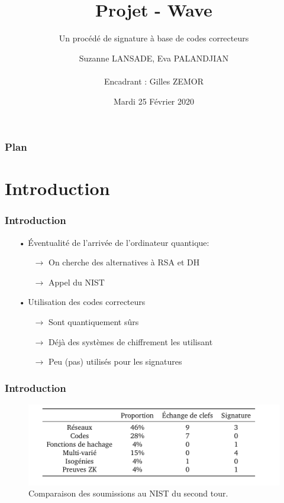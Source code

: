 \documentclass[10pt,a4paper]{beamer}
\title{Projet - Wave}
\subtitle{Un procédé de signature à base de codes correcteurs}
\author{ Suzanne LANSADE, Eva PALANDJIAN \\\quad\quad\quad\quad\quad \\Encadrant : Gilles ZEMOR}
\institute[Master CSI]{Master CSI, Université de Bordeaux, France}
\date{Mardi 25 Février 2020}
\theoremstyle{plain}
\theoremstyle{definition}
\begin{document}
\begin{frame}
  \vspace{3.5em}
  \titlepage

\end{frame}

\begin{frame}
  \frametitle{Plan}
  \tableofcontents[subsectionstyle=hide]
\end{frame}

\section{Introduction}
\begin{frame}
\frametitle{Introduction}
\begin{itemize}
\item[•] Éventualité de l'arrivée de l'ordinateur quantique:
       \begin{itemize}
       \item[$\rightarrow$] On cherche des alternatives à RSA et DH 
       \item[$\rightarrow$] Appel du NIST
       \end{itemize}
\vspace{0.2in}
\item[•] Utilisation des codes correcteurs
       \begin{itemize}
       \item[$\rightarrow$] Sont quantiquement
        sûrs
       \item[$\rightarrow$] Déjà des systèmes de chiffrement les utilisant
       \item[$\rightarrow$] Peu (pas) utilisés pour les signatures
       \end{itemize}
\end{itemize}
\end{frame}

\begin{frame}
\frametitle{Introduction}
\begin{figure}[h]
\begin{center}
\includegraphics [scale=0.3]{../rapport/include/nist_second_tour.png}
\end{center}
\caption{\small Comparaison des soumissions au NIST du second tour.}
\end{figure}
\end{frame}
\end{document}
